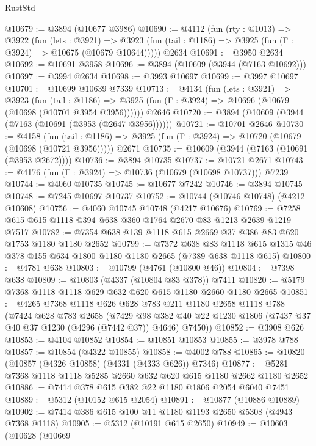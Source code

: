 \begin{lexlean}{RustStd}
\begin{coremodule}
@10679 := @3894 (@10677 @3986)
@10690 := @4112
    (fun (rty : @1013) =>
    @3922
      (fun (lets : @3921) =>
      @3923 (fun (tail : @1186) => @3925 (fun (Γ : @3924) => @10675 (@10679 @10644)))))
    @2634
@10691 := @3950 @2634
@10692 := @10691 @3958
@10696 := @3894 (@10609 (@3944 (@7163 @10692)))
@10697 := @3994 @2634
@10698 := @3993 @10697
@10699 := @3997 @10697
@10701 := @10699 @10639 @7339
@10713 := @4134
    (fun (lets : @3921) =>
    @3923
      (fun (tail : @1186) =>
      @3925 (fun (Γ : @3924) => @10696 (@10679 (@10698 (@10701 @3954 @3956))))))
    @2646
@10720 := @3894 (@10609 (@3944 (@7163 (@10691 (@3953 (@2647 @3956))))))
@10721 := @10701 @2646
@10730 := @4158
    (fun (tail : @1186) => @3925 (fun (Γ : @3924) => @10720 (@10679 (@10698 (@10721 @3956)))))
    @2671
@10735 := @10609 (@3944 (@7163 (@10691 (@3953 @2672))))
@10736 := @3894 @10735
@10737 := @10721 @2671
@10743 := @4176 (fun (Γ : @3924) => @10736 (@10679 (@10698 @10737))) @7239
@10744 := @4060 @10735
@10745 := @10677 @7242
@10746 := @3894 @10745
@10748 := @7245 @10697 @10737
@10752 := @10744 (@10746 @10748) (@4212 @10608)
@10756 := @4060 @10745 @10748 (@4217 @10676)
@10769 := @7258 @615 @615 @1118 @394 @638 @360 @1764 @2670 @83 @1213 @2639 @1219 @7517
@10782 := @7354 @638 @139 @1118 @615 @2669 @37 @386 @83 @620 @1753 @1180 @1180 @2652
@10799 := @7372
    @638
    @83
    @1118
    @615
    @1315
    @46
    @378
    @155
    @634
    @1800
    @1180
    @1180
    @2665
    (@7389 @638 @1118 @615)
@10800 := @4781 @638
@10803 := @10799 (@4761 (@10800 @46))
@10804 := @7398 @638
@10809 := @10803 (@4337 (@10804 @83 @378)) @7411
@10820 := @5179 @7368 @1118 @1118 @629 @632 @620 @615 @1180 @2660 @1180 @2665
@10851 := @4265
    @7368
    @1118
    @626
    @628
    @783
    @211
    @1180
    @2658
    @1118
    @788
    (@7424
      @628
      @783
      @2658
      (@7429
        @98
        @382
        @40
        @22
        @1230
        @1806
        (@7437 @37 @40 @37 @1230 (@4296 (@7442 @37)) @4646)
        @7450))
@10852 := @3908 @626
@10853 := @4104 @10852
@10854 := @10851 @10853
@10855 := @3978 @788
@10857 := @10854 (@4322 @10855)
@10858 := @4002 @788
@10865 := @10820 (@10857 (@4326 @10858) (@4331 (@4333 @626)) @7346)
@10877 := @5281 @7368 @1118 @1118 @5285 @2660 @632 @620 @615 @1180 @2662 @1180 @2652
@10886 := @7414 @378 @615 @382 @22 @1180 @1806 @2054 @6040 @7451
@10889 := @5312 (@10152 @615 @2054)
@10891 := @10877 (@10886 @10889)
@10902 := @7414 @386 @615 @100 @11 @1180 @1193 @2650 @5308 (@4943 @7368 @1118)
@10905 := @5312 (@10191 @615 @2650)
@10949 := @10603
    (@10628
      (@10669

\end{coremodule}
\end{lexlean}
